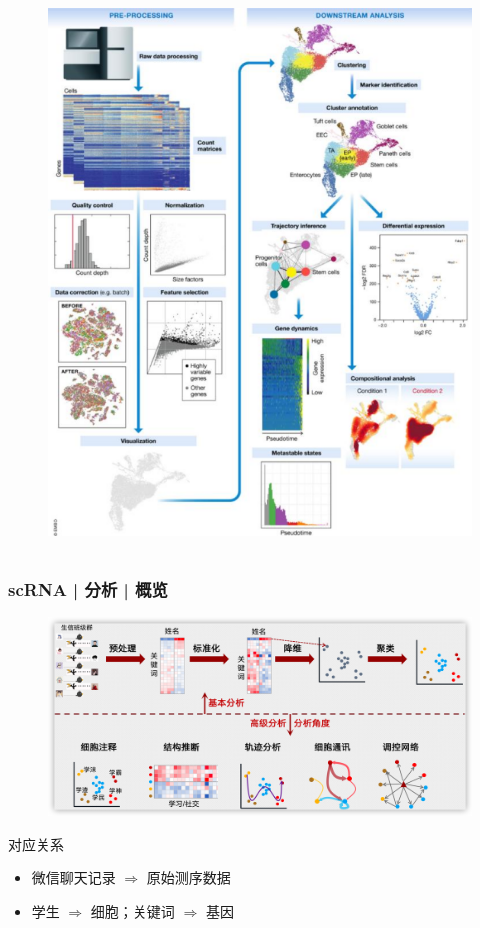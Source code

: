 \documentclass[11pt]{ctexbeamer}
\begin{document}
\begin{frame}
\begin{columns}
\begin{figure}
    \includegraphics[width=\textwidth]{scRNA_analysis_workflow_02.png}
  \end{figure}
  \end{columns}
\end{frame}

\begin{frame}
  \frametitle{scRNA | 分析 | 概览}
  \begin{figure}
    \centering
    \includegraphics[width=\textwidth]{scRNA_analysis_workflow_04.png}
  \end{figure}
  \begin{block}{对应关系}
  \begin{itemize}
  \item 微信聊天记录 $\Longrightarrow$ 原始测序数据
  \item 学生 $\Longrightarrow$ 细胞；关键词 $\Longrightarrow$ 基因
  \end{itemize}
  \end{block}
\end{frame}
\end{document}
